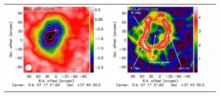 \documentclass[twocolumn,traditabstract]{aa}
\begin{document}
\begin{figure}[p]
{\begin{tabular}{lll}
\includegraphics[trim=0cm 2.2cm 0cm 0cm, clip=true, scale=1]{Figure/Map_MACSJ0717.pdf} & 
\includegraphics[trim=2.3cm 2.2cm 0cm 0cm, clip=true, scale=1]{Figure/Grad_MACSJ0717_15_15_45.pdf} & 

\end{tabular}}
\end{figure}
\end{document}
